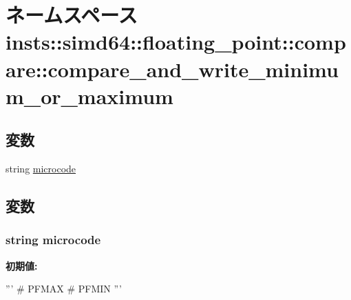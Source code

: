 \hypertarget{namespaceinsts_1_1simd64_1_1floating__point_1_1compare_1_1compare__and__write__minimum__or__maximum}{
\section{ネームスペース insts::simd64::floating\_\-point::compare::compare\_\-and\_\-write\_\-minimum\_\-or\_\-maximum}
\label{namespaceinsts_1_1simd64_1_1floating__point_1_1compare_1_1compare__and__write__minimum__or__maximum}
}
\subsection*{変数}
\begin{DoxyCompactItemize}
\item 
string \hyperlink{namespaceinsts_1_1simd64_1_1floating__point_1_1compare_1_1compare__and__write__minimum__or__maximum_a770f11a173e99389a8802f0107ed8f52}{microcode}
\end{DoxyCompactItemize}


\subsection{変数}
\hypertarget{namespaceinsts_1_1simd64_1_1floating__point_1_1compare_1_1compare__and__write__minimum__or__maximum_a770f11a173e99389a8802f0107ed8f52}{
\subsubsection[{microcode}]{\setlength{\rightskip}{0pt plus 5cm}string {\bf microcode}}}
\label{namespaceinsts_1_1simd64_1_1floating__point_1_1compare_1_1compare__and__write__minimum__or__maximum_a770f11a173e99389a8802f0107ed8f52}
{\bfseries 初期値:}
\begin{DoxyCode}
'''
# PFMAX
# PFMIN
'''
\end{DoxyCode}
